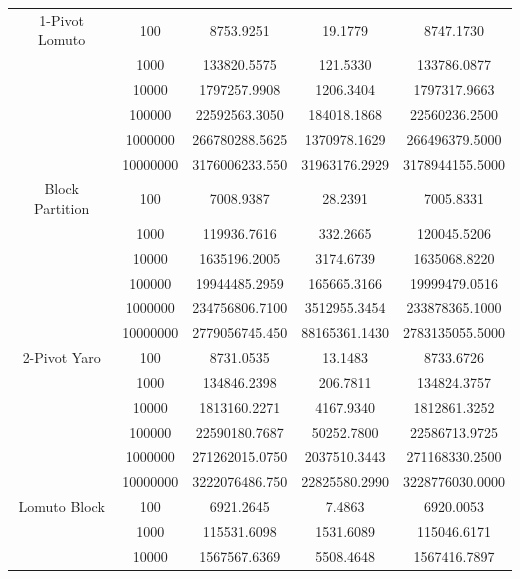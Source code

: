 \documentclass{article}
\begin{document}
\begin{center}
\begin{tabular}{ |c c | c c c| }
        \hline
        1-Pivot Lomuto  & 100      & 8753.9251      & 19.1779       & 8747.1730 \\
                        & 1000     & 133820.5575    & 121.5330      & 133786.0877 \\
                        & 10000    & 1797257.9908   & 1206.3404     & 1797317.9663 \\
                        & 100000   & 22592563.3050  & 184018.1868   & 22560236.2500 \\
                        & 1000000  & 266780288.5625 & 1370978.1629  & 266496379.5000 \\
                        & 10000000 & 3176006233.550 & 31963176.2929 & 3178944155.5000 \\
        Block Partition & 100      & 7008.9387      & 28.2391       & 7005.8331 \\
                        & 1000     & 119936.7616    & 332.2665      & 120045.5206 \\
                        & 10000    & 1635196.2005   & 3174.6739     & 1635068.8220 \\
                        & 100000   & 19944485.2959  & 165665.3166   & 19999479.0516 \\
                        & 1000000  & 234756806.7100 & 3512955.3454  & 233878365.1000 \\
                        & 10000000 & 2779056745.450 & 88165361.1430 & 2783135055.5000 \\
        \hline
        2-Pivot Yaro    & 100      & 8731.0535      & 13.1483       & 8733.6726 \\
                        & 1000     & 134846.2398    & 206.7811      & 134824.3757 \\
                        & 10000    & 1813160.2271   & 4167.9340     & 1812861.3252 \\
                        & 100000   & 22590180.7687  & 50252.7800    & 22586713.9725 \\
                        & 1000000  & 271262015.0750 & 2037510.3443  & 271168330.2500 \\
                        & 10000000 & 3222076486.750 & 22825580.2990 & 3228776030.0000 \\
        Lomuto Block    & 100      & 6921.2645      & 7.4863        & 6920.0053 \\
                        & 1000     & 115531.6098    & 1531.6089     & 115046.6171 \\
                        & 10000    & 1567567.6369   & 5508.4648     & 1567416.7897 \\

\end{tabular}
\end{center}
\end{document}
